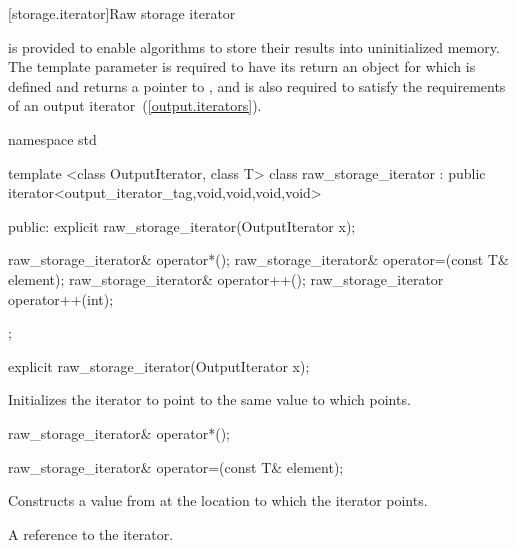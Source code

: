 [storage.iterator]{Raw storage iterator}

\pnum
{} is provided to enable algorithms to store their
results into uninitialized memory. The template parameter
 is required to have its  return an
object for which  is defined and returns a pointer to
, and is also required to satisfy the requirements of an output
iterator~(\ref{output.iterators}).

\begin{codeblock}
namespace std {
  template <class OutputIterator, class T>
  class raw_storage_iterator
    : public iterator<output_iterator_tag,void,void,void,void> {
  public:
    explicit raw_storage_iterator(OutputIterator x);

    raw_storage_iterator& operator*();
    raw_storage_iterator& operator=(const T& element);
    raw_storage_iterator& operator++();
    raw_storage_iterator  operator++(int);
  };
}
\end{codeblock}

%
\begin{itemdecl}
explicit raw_storage_iterator(OutputIterator x);
\end{itemdecl}

\begin{itemdescr}
\pnum
\effects
Initializes the iterator to point to the same value to which  points.
\end{itemdescr}

\begin{itemdecl}
raw_storage_iterator& operator*();
\end{itemdecl}

\begin{itemdescr}
\pnum
\returns
{}
\end{itemdescr}

\begin{itemdecl}
raw_storage_iterator& operator=(const T& element);
\end{itemdecl}

\begin{itemdescr}
\pnum
\effects
Constructs a value from  at the location to which the iterator points.

\pnum
\returns
A reference to the iterator.
\end{itemdescr}

